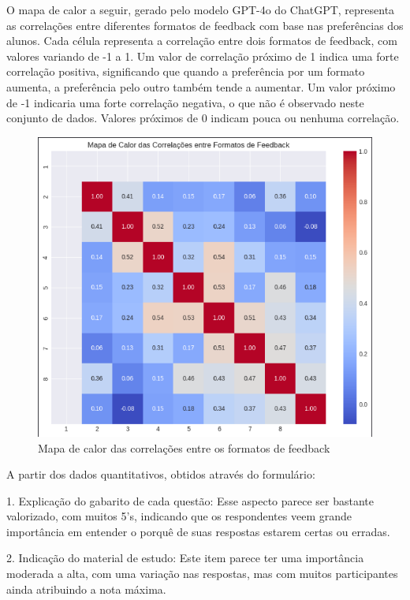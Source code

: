 O mapa de calor a seguir, gerado pelo modelo GPT-4o do ChatGPT, representa as correlações entre diferentes formatos de feedback com base nas preferências dos alunos. Cada célula representa a correlação entre dois formatos de feedback, com valores variando de -1 a 1. Um valor de correlação próximo de 1 indica uma forte correlação positiva, significando que quando a preferência por um formato aumenta, a preferência pelo outro também tende a aumentar. Um valor próximo de -1 indicaria uma forte correlação negativa, o que não é observado neste conjunto de dados. Valores próximos de 0 indicam pouca ou nenhuma correlação.

\begin{figure}[H]
\centering
\includegraphics[scale=0.6]{figuras/heatmap.png}
\caption{Mapa de calor das correlações entre os formatos de feedback}
\end{figure}

A partir dos dados quantitativos, obtidos através do formulário: 

1. Explicação do gabarito de cada questão: Esse aspecto parece ser bastante valorizado, com muitos 5's, indicando que os respondentes veem grande importância em entender o porquê de suas respostas estarem certas ou erradas.

2. Indicação do material de estudo: Este item parece ter uma importância moderada a alta, com uma variação nas respostas, mas com muitos participantes ainda atribuindo a nota máxima.

